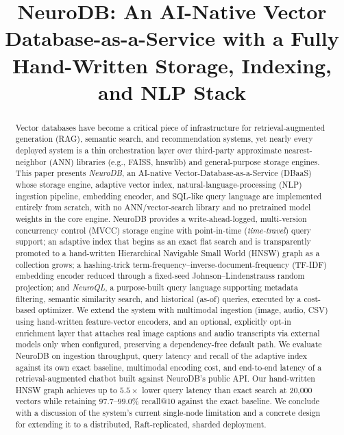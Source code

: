 \documentclass[conference]{IEEEtran}
\begin{document}
\title{NeuroDB: An AI-Native Vector Database-as-a-Service with a Fully Hand-Written Storage, Indexing, and NLP Stack}

\author{
}

\maketitle

\begin{abstract}
Vector databases have become a critical piece of infrastructure for retrieval-augmented
generation (RAG), semantic search, and recommendation systems, yet nearly every deployed
system is a thin orchestration layer over third-party approximate nearest-neighbor (ANN)
libraries (e.g., FAISS, hnswlib) and general-purpose storage engines. This paper presents
\emph{NeuroDB}, an AI-native Vector-Database-as-a-Service (DBaaS) whose storage engine,
adaptive vector index, natural-language-processing (NLP) ingestion pipeline, embedding
encoder, and SQL-like query language are implemented entirely from scratch, with no
ANN/vector-search library and no pretrained model weights in the core engine. NeuroDB
provides a write-ahead-logged, multi-version concurrency control (MVCC) storage engine with
point-in-time (\emph{time-travel}) query support; an adaptive index that begins as an exact
flat search and is transparently promoted to a hand-written Hierarchical Navigable Small
World (HNSW) graph as a collection grows; a hashing-trick term-frequency--inverse-document-frequency
(TF-IDF) embedding encoder reduced through a fixed-seed Johnson--Lindenstrauss random
projection; and \emph{NeuroQL}, a purpose-built query language supporting metadata filtering,
semantic similarity search, and historical (as-of) queries, executed by a cost-based
optimizer. We extend the system with multimodal ingestion (image, audio, CSV) using
hand-written feature-vector encoders, and an optional, explicitly opt-in enrichment layer
that attaches real image captions and audio transcripts via external models only when
configured, preserving a dependency-free default path. We evaluate NeuroDB on ingestion
throughput, query latency and recall of the adaptive index against its own exact baseline,
multimodal encoding cost, and end-to-end latency of a retrieval-augmented chatbot built
against NeuroDB's public API. Our hand-written HNSW graph achieves up to $5.5\times$ lower
query latency than exact search at 20{,}000 vectors while retaining $97.7$--$99.0\%$
recall@10 against the exact baseline. We conclude with a discussion of the system's
current single-node limitation and a concrete design for extending it to a distributed,
Raft-replicated, sharded deployment.
\end{abstract}
\end{document}
